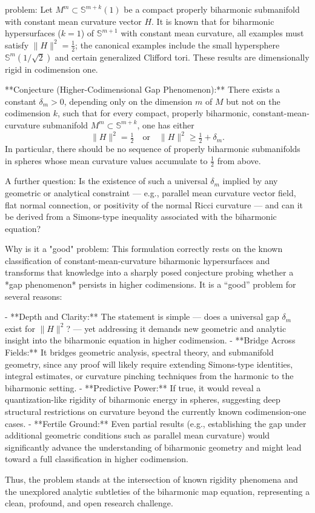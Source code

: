 problem:  
Let \( M^m \subset \mathbb{S}^{m+k}(1) \) be a compact properly biharmonic submanifold with constant mean curvature vector \(H\).  
It is known that for biharmonic hypersurfaces (\(k=1\)) of \(\mathbb{S}^{m+1}\) with constant mean curvature, all examples must satisfy \(\|H\|^2 = \tfrac12\); the canonical examples include the small hypersphere \(\mathbb{S}^m(1/\sqrt{2})\) and certain generalized Clifford tori. These results are dimensionally rigid in codimension one.  

**Conjecture (Higher-Codimensional Gap Phenomenon):**  
There exists a constant \(\delta_m > 0\), depending only on the dimension \(m\) of \(M\) but not on the codimension \(k\), such that for every compact, properly biharmonic, constant-mean-curvature submanifold \(M^m \subset \mathbb{S}^{m+k}\), one has either  
\[
\|H\|^2 = \tfrac{1}{2} \quad \text{or} \quad \|H\|^2 \ge \tfrac{1}{2} + \delta_m.
\]
In particular, there should be no sequence of properly biharmonic submanifolds in spheres whose mean curvature values accumulate to \(\tfrac{1}{2}\) from above.  

A further question: Is the existence of such a universal \(\delta_m\) implied by any geometric or analytical constraint — e.g., parallel mean curvature vector field, flat normal connection, or positivity of the normal Ricci curvature — and can it be derived from a Simons-type inequality associated with the biharmonic equation?  

Why is it a "good" problem:  
This formulation correctly rests on the known classification of constant-mean-curvature biharmonic hypersurfaces and transforms that knowledge into a sharply posed conjecture probing whether a *gap phenomenon* persists in higher codimensions.  
It is a “good” problem for several reasons:  

- **Depth and Clarity:** The statement is simple — does a universal gap \( \delta_m \) exist for \(\|H\|^2\)? — yet addressing it demands new geometric and analytic insight into the biharmonic equation in higher codimension.  
- **Bridge Across Fields:** It bridges geometric analysis, spectral theory, and submanifold geometry, since any proof will likely require extending Simons-type identities, integral estimates, or curvature pinching techniques from the harmonic to the biharmonic setting.  
- **Predictive Power:** If true, it would reveal a quantization-like rigidity of biharmonic energy in spheres, suggesting deep structural restrictions on curvature beyond the currently known codimension-one cases.  
- **Fertile Ground:** Even partial results (e.g., establishing the gap under additional geometric conditions such as parallel mean curvature) would significantly advance the understanding of biharmonic geometry and might lead toward a full classification in higher codimension.  

Thus, the problem stands at the intersection of known rigidity phenomena and the unexplored analytic subtleties of the biharmonic map equation, representing a clean, profound, and open research challenge.